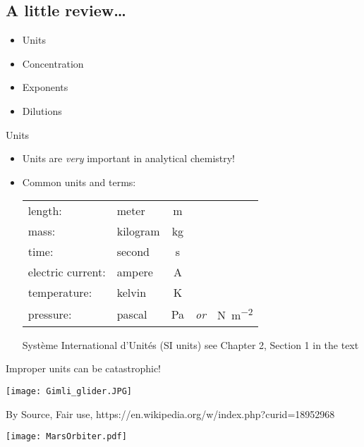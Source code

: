 \documentclass[notes=hide]{beamer}
\begin{document}
\begin{frame}
	\section{A little review\ldots}
	\begin{center}
	\parbox{0.5\linewidth}{
	\begin{itemize}
		\item Units
		\item Concentration
		\item Exponents
		\item Dilutions
	\end{itemize}
}
\end{center}
\end{frame}

\begin{frame}{Units}
	\begin{itemize}
		\item Units are \emph{very} important in analytical chemistry!

		\item Common units and terms:
	\begin{center}
	\begin{tabular} {l l c c c}
		length: & meter & \si{\meter} \\
		mass: & kilogram & \si{\kilo\gram} \\
		time: & second & \si{\second} \\
		electric current: & ampere & \si{\ampere} \\
		temperature: & kelvin & \si{\kelvin} \\
		pressure: & pascal & \si{\pascal} & \emph{or} &
			\si{\newton\per\meter\squared} \\
	\end{tabular}
	\end{center}

	\begin{block}{Syst\`{e}me International d'Unit\'{e}s (SI units)}
		see Chapter 2, Section 1 in the text
	\end{block}
	\end{itemize}
\end{frame}

\begin{frame}[allowframebreaks]{Improper units can be catastrophic!}
	\begin{center}
		\texttt{[image: Gimli\_glider.JPG]}
	\end{center}
	
	\footnotesize By Source, Fair use,
	https://en.wikipedia.org/w/index.php?curid=18952968

	\framebreak

	\begin{center}
		\texttt{[image: MarsOrbiter.pdf]}
	\end{center}
\end{frame}
\end{document}
